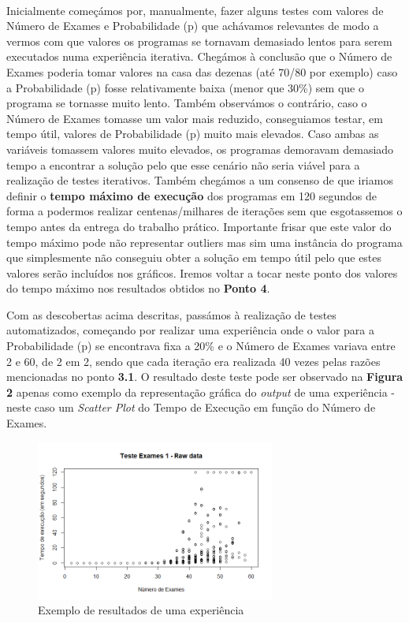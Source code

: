 \documentclass{article}
\begin{document}
\paragraph{}
Inicialmente começámos por, manualmente, fazer alguns testes com valores de Número de Exames e Probabilidade (p) que achávamos relevantes de modo a vermos com que valores os programas se tornavam demasiado lentos para serem executados numa experiência iterativa. Chegámos à conclusão que o Número de Exames poderia tomar valores na casa das dezenas (até 70/80 por exemplo) caso a Probabilidade (p) fosse relativamente baixa (menor que 30\%) sem que o programa se tornasse muito lento. Também observámos o contrário, caso o Número de Exames tomasse um valor mais reduzido, conseguiamos testar, em tempo útil, valores de Probabilidade (p) muito mais elevados. Caso ambas as variáveis tomassem valores muito elevados, os programas demoravam demasiado tempo a encontrar a solução pelo que esse cenário não seria viável para a realização de testes iterativos. Também chegámos a um consenso de que iriamos definir o \textbf{tempo máximo de execução} dos programas em 120 segundos de forma a podermos realizar centenas/milhares de iterações sem que esgotassemos o tempo antes da entrega do trabalho prático. Importante frisar que este valor do tempo máximo pode não representar outliers mas sim uma instância do programa que simplesmente não conseguiu obter a solução em tempo útil pelo que estes valores serão incluídos nos gráficos. Iremos voltar a tocar neste ponto dos valores do tempo máximo nos resultados obtidos no \textbf{Ponto 4}.\par
Com as descobertas acima descritas, passámos à realização de testes automatizados, começando por realizar uma experiência onde o valor para a Probabilidade (p) se encontrava fixa a 20\% e o Número de Exames variava entre 2 e 60, de 2 em 2, sendo que cada iteração era realizada 40 vezes pelas razões mencionadas no ponto \textbf{3.1}. O resultado deste teste pode ser observado na \textbf{Figura 2} apenas como exemplo da representação gráfica do \textit{output} de uma experiência - neste caso um \textit{Scatter Plot} do Tempo de Execução em função do Número de Exames.

\begin{figure} [!htbp]
    \centering
    \includegraphics[width=0.7\textwidth]{testeExames_raw.png}
    \caption{Exemplo de resultados de uma experiência}
    \label{fig:testeExames_raw}
\end{figure}
\end{document}
